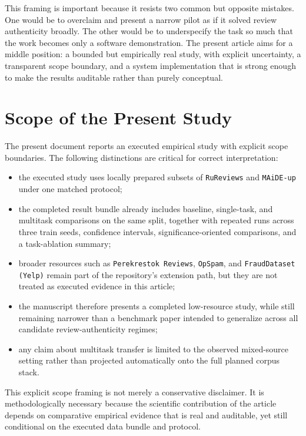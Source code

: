 \documentclass[12pt,a4paper]{article}
\begin{document}
This framing is important because it resists two common but opposite mistakes. One would be to overclaim and present a narrow pilot as if it solved review authenticity broadly. The other would be to underspecify the task so much that the work becomes only a software demonstration. The present article aims for a middle position: a bounded but empirically real study, with explicit uncertainty, a transparent scope boundary, and a system implementation that is strong enough to make the results auditable rather than purely conceptual.

\section{Scope of the Present Study}

The present document reports an executed empirical study with explicit scope boundaries. The following distinctions are critical for correct interpretation:

\begin{itemize}[leftmargin=1.5cm]
  \item the executed study uses locally prepared subsets of \texttt{RuReviews} and \texttt{MAiDE-up} under one matched protocol;
  \item the completed result bundle already includes baseline, single-task, and multitask comparisons on the same split, together with repeated runs across three train seeds, confidence intervals, significance-oriented comparisons, and a task-ablation summary;
  \item broader resources such as \texttt{Perekrestok Reviews}, \texttt{OpSpam}, and \texttt{FraudDataset (Yelp)} remain part of the repository's extension path, but they are not treated as executed evidence in this article;
  \item the manuscript therefore presents a completed low-resource study, while still remaining narrower than a benchmark paper intended to generalize across all candidate review-authenticity regimes;
  \item any claim about multitask transfer is limited to the observed mixed-source setting rather than projected automatically onto the full planned corpus stack.
\end{itemize}

This explicit scope framing is not merely a conservative disclaimer. It is methodologically necessary because the scientific contribution of the article depends on comparative empirical evidence that is real and auditable, yet still conditional on the executed data bundle and protocol.
\end{document}
